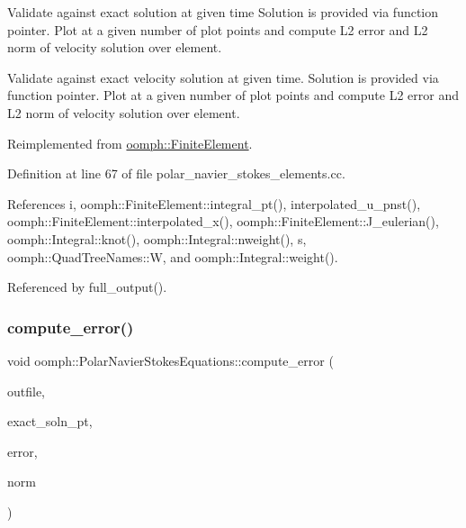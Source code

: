 Validate against exact solution at given time Solution is provided via function pointer. Plot at a given number of plot points and compute L2 error and L2 norm of velocity solution over element. 

Validate against exact velocity solution at given time. Solution is provided via function pointer. Plot at a given number of plot points and compute L2 error and L2 norm of velocity solution over element. 

Reimplemented from \hyperlink{classoomph_1_1FiniteElement_a7f67853506dc73fa6b7505108de22d1f}{oomph\+::\+Finite\+Element}.



Definition at line 67 of file polar\+\_\+navier\+\_\+stokes\+\_\+elements.\+cc.



References i, oomph\+::\+Finite\+Element\+::integral\+\_\+pt(), interpolated\+\_\+u\+\_\+pnst(), oomph\+::\+Finite\+Element\+::interpolated\+\_\+x(), oomph\+::\+Finite\+Element\+::\+J\+\_\+eulerian(), oomph\+::\+Integral\+::knot(), oomph\+::\+Integral\+::nweight(), s, oomph\+::\+Quad\+Tree\+Names\+::W, and oomph\+::\+Integral\+::weight().



Referenced by full\+\_\+output().

\mbox{\label{classoomph_1_1PolarNavierStokesEquations_afcd9707018a88a40b1c8408f711b9eb6}} 
\subsubsection{\texorpdfstring{compute\+\_\+error()}{compute\_error()}\hspace{0.1cm}{\footnotesize\ttfamily [2/2]}}
{\footnotesize\ttfamily void oomph\+::\+Polar\+Navier\+Stokes\+Equations\+::compute\+\_\+error (\begin{DoxyParamCaption}\item[{std\+::ostream \&}]{outfile,  }\item[{\hyperlink{classoomph_1_1FiniteElement_a690fd33af26cc3e84f39bba6d5a85202}{Finite\+Element\+::\+Steady\+Exact\+Solution\+Fct\+Pt}}]{exact\+\_\+soln\+\_\+pt,  }\item[{double \&}]{error,  }\item[{double \&}]{norm }\end{DoxyParamCaption})\hspace{0.3cm}{\ttfamily [virtual]}}



